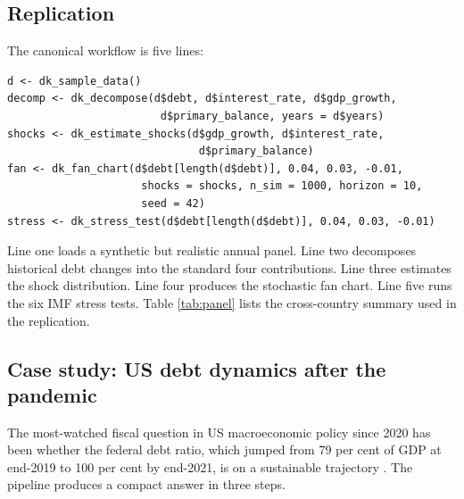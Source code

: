 \subsection{Replication}\label{replication}

The canonical workflow is five lines:

\begin{verbatim}
d <- dk_sample_data()
decomp <- dk_decompose(d$debt, d$interest_rate, d$gdp_growth,
                        d$primary_balance, years = d$years)
shocks <- dk_estimate_shocks(d$gdp_growth, d$interest_rate,
                              d$primary_balance)
fan <- dk_fan_chart(d$debt[length(d$debt)], 0.04, 0.03, -0.01,
                     shocks = shocks, n_sim = 1000, horizon = 10,
                     seed = 42)
stress <- dk_stress_test(d$debt[length(d$debt)], 0.04, 0.03, -0.01)
\end{verbatim}

Line one loads a synthetic but realistic annual panel. Line two
decomposes historical debt changes into the standard four contributions.
Line three estimates the shock distribution. Line four produces the
stochastic fan chart. Line five runs the six IMF stress tests. Table
\ref{tab:panel} lists the cross-country summary used in the replication.

\begin{table}[!htbp]
\centering
\caption{\textbf{Central government debt, three advanced economies, first and latest observations plus peak.} Data: World Bank . Italy remains above 130 per cent of GDP throughout the post-2010 period; the United Kingdom and the United States rose from roughly 30 per cent in 1990 to near 100 per cent by the early 2020s.}
\label{tab:panel}

\end{table}

\subsection{Case study: US debt dynamics after the
pandemic}\label{case-study-us-debt-dynamics-after-the-pandemic}

The most-watched fiscal question in US macroeconomic policy since 2020
has been whether the federal debt ratio, which jumped from 79 per cent
of GDP at end-2019 to 100 per cent by end-2021, is on a sustainable
trajectory \citep{blanchard2022fiscal, furman2023weworry}. The
 pipeline produces a compact answer in three steps.

